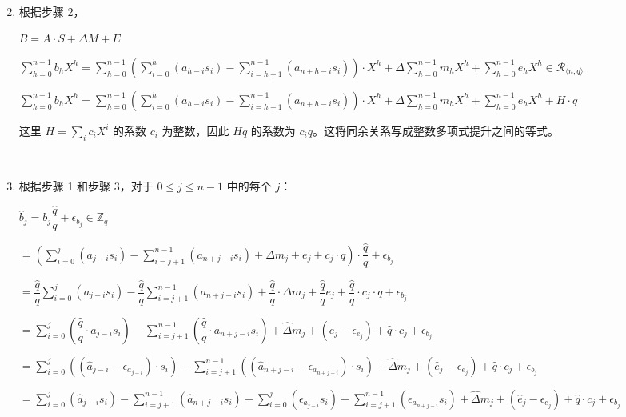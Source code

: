 \begin{enumerate}
$ $




\item 根据步骤 2，

$B = A \cdot S + \Delta  M + E$ 


$\sum\limits_{h=0}^{n-1}  b_h  X^{h}  = \sum\limits_{h=0}^{n-1}  \left(\sum\limits_{i=0}^{h}(a_{h-i}s_{i}) - \sum\limits_{i=h+1}^{n-1}(a_{n+h-i}s_{i}) \right)\cdot X^{h}  + \Delta \sum\limits_{h=0}^{n-1}  m_h  X^{h} + \sum\limits_{h=0}^{n-1}  e_h  X^{h}  \in \mathcal{R}_{\langle n,q\rangle}$

$\sum\limits_{h=0}^{n-1}  b_h  X^{h}  = \sum\limits_{h=0}^{n-1}  \left(\sum\limits_{i=0}^{h}(a_{h-i}s_{i}) - \sum\limits_{i=h+1}^{n-1}(a_{n+h-i}s_{i}) \right)\cdot X^{h}  + \Delta \sum\limits_{h=0}^{n-1}  m_h  X^{h} + \sum\limits_{h=0}^{n-1}  e_h  X^{h} + H \cdot q$

这里 $H=\sum_i c_iX^i$ 的系数 $c_i$ 为整数，因此 $Hq$ 的系数为 $c_iq$。这将同余关系写成整数多项式提升之间的等式。

$ $

\item 根据步骤 1 和步骤 3，对于 $0 \leq j \leq n-1$ 中的每个 $j$：

$\hat{b}_j = b_j\dfrac{\hat{q}}{q} + \epsilon_{b_j} \in \mathbb{Z}_{\hat{q}}$

$= \left(\sum\limits_{i=0}^{j}(a_{j-i}s_{i}) - \sum\limits_{i=j+1}^{n-1}(a_{n+j-i}s_{i}) + \Delta m_j + e_j + c_j \cdot q\right) \cdot \dfrac{\hat{q}}{q} + \epsilon_{b_j}$

$= \dfrac{\hat{q}}{q} \sum\limits_{i=0}^{j}(a_{j-i}s_{i}) - \dfrac{\hat{q}}{q} \sum\limits_{i=j+1}^{n-1}(a_{n+j-i}s_{i}) + \dfrac{\hat{q}}{q} \cdot \Delta m_j + \dfrac{\hat{q}}{q} e_j + \dfrac{\hat{q}}{q} \cdot c_j \cdot q + \epsilon_{b_j}$

$=  \sum\limits_{i=0}^{j}\left(\dfrac{\hat{q}}{q}\cdot a_{j-i}s_{i}\right) - \sum\limits_{i=j+1}^{n-1}\left(\dfrac{\hat{q}}{q} \cdot a_{n+j-i}s_{i}\right) + \hat{\Delta} m_j + (\hat{e}_j - \epsilon_{e_j}) + \hat{q} \cdot c_j + \epsilon_{b_j}$

$=  \sum\limits_{i=0}^{j}((\hat{a}_{j-i}-\epsilon_{a_{j-i}})\cdot s_{i}) - \sum\limits_{i=j+1}^{n-1}((\hat{a}_{n+j-i}-\epsilon_{a_{n+j-i}})\cdot s_{i}) + \hat{\Delta} m_j + (\hat{e}_j - \epsilon_{e_j}) + \hat{q} \cdot c_j + \epsilon_{b_j}$

$=  \sum\limits_{i=0}^{j}(\hat{a}_{j-i}s_i) 
- \sum\limits_{i=j+1}^{n-1}(\hat{a}_{n+j-i}s_i)
- \sum\limits_{i=0}^{j}(\epsilon_{a_{j-i}} s_i)
+ \sum\limits_{i=j+1}^{n-1}(\epsilon_{a_{n+j-i}} s_i)
+ \hat{\Delta} m_j + (\hat{e}_j - \epsilon_{e_j}) + \hat{q} \cdot c_j + \epsilon_{b_j}$



\end{enumerate}
